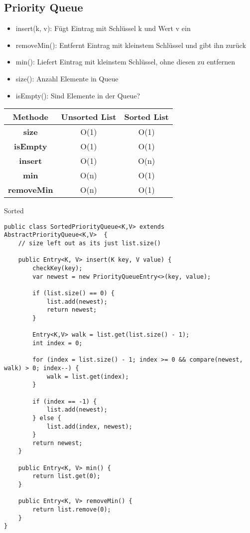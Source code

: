 \begin{multicols*}{4}
	\subsection{Priority Queue}
		\begin{itemize}
			\item insert(k, v): Fügt Eintrag mit Schlüssel k und Wert v ein
			\item removeMin(): Entfernt Eintrag mit kleinstem Schlüssel und gibt ihn zurück
			\item min(): Liefert Eintrag mit kleinstem Schlüssel, ohne diesen zu entfernen
			\item size(): Anzahl Elemente in Queue
			\item isEmpty(): Sind Elemente in der Queue?
		\end{itemize}
		
		\begin{tabular}{c | c | c}
			\textbf{Methode} & \textbf{Unsorted List} & \textbf{Sorted List} \\
			\hline
			\textbf{size} & O(1) & O(1) \\
			\textbf{isEmpty} & O(1) & O(1) \\
			\textbf{insert} & O(1) & O(n) \\
			\textbf{min} & O(n) & O(1) \\
			\textbf{removeMin} & O(n) & O(1) \\
		\end{tabular}
	
	Sorted
	\begin{lstlisting}
public class SortedPriorityQueue<K,V> extends AbstractPriorityQueue<K,V>  {
	// size left out as its just list.size()
	
	public Entry<K, V> insert(K key, V value) {		
		checkKey(key);
		var newest = new PriorityQueueEntry<>(key, value);
		
		if (list.size() == 0) {
			list.add(newest);
			return newest;
		}
		
		Entry<K,V> walk = list.get(list.size() - 1);
		int index = 0;
		
		for (index = list.size() - 1; index >= 0 && compare(newest, walk) > 0; index--) {
			walk = list.get(index);	
		}
		
		if (index == -1) {
			list.add(newest);
		} else {
			list.add(index, newest);
		}
		return newest;
	}
	
	public Entry<K, V> min() {
		return list.get(0);
	}
	
	public Entry<K, V> removeMin() {
		return list.remove(0);
	}
}
	\end{lstlisting}


\end{multicols*}
